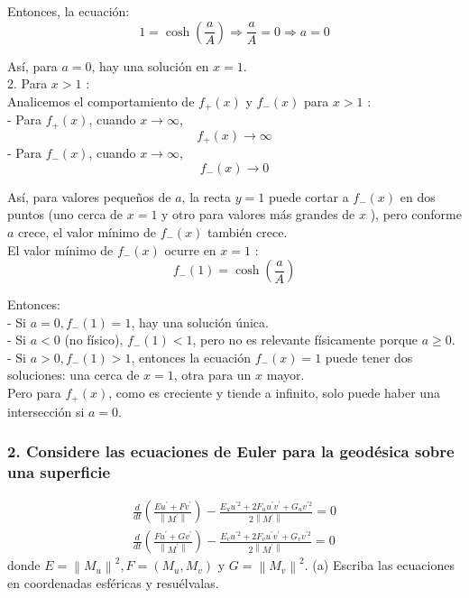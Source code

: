 \documentclass{article}
\theoremstyle{nonumberplain}
\begin{document}
Entonces, la ecuación:
\[
1=\cosh \left(\frac{a}{A}\right) \Longrightarrow \frac{a}{A}=0 \Longrightarrow a=0
\]

Así, para \( a=0 \), hay una solución en \( x=1 \).\\
2. Para \( x>1 \) :\\

Analicemos el comportamiento de \( f_{+}(x) \) y \( f_{-}(x) \) para \( x>1 \) :\\
- Para \( f_{+}(x) \), cuando \( x \rightarrow \infty \),
\[
f_{+}(x) \rightarrow \infty
\]
- Para \( f_{-}(x) \), cuando \( x \rightarrow \infty \),
\[
f_{-}(x) \rightarrow 0
\]

Así, para valores pequeños de \( a \), la recta \( y=1 \) puede cortar a \( f_{-}(x) \) en dos puntos (uno cerca de \( x=1 \) y otro para valores más grandes de \( x \) ), pero conforme \( a \) crece, el valor mínimo de \( f_{-}(x) \) también crece. \\

El valor mínimo de \( f_{-}(x) \) ocurre en \( x=1 \) :
\[
f_{-}(1)=\cosh \left(\frac{a}{A}\right)
\]

Entonces: \\
- Si \( a=0, f_{-}(1)=1 \), hay una solución única. \\
- Si \( a<0 \) (no físico), \( f_{-}(1)<1 \), pero no es relevante físicamente porque \( a \geq 0 \). \\
- Si \( a>0, f_{-}(1)>1 \), entonces la ecuación \( f_{-}(x)=1 \) puede tener dos soluciones: una cerca de \( x=1 \), otra para un \( x \) mayor. \\

Pero para \( f_{+}(x) \), como es creciente y tiende a infinito, solo puede haber una intersección si \( a=0 \).

\subsubsection*{2. Considere las ecuaciones de Euler para la geodésica sobre una superficie}
\[
\begin{array}{l}
\frac{d}{d t}\left(\frac{E u^{\prime}+F v^{\prime}}{\left\|M^{\prime}\right\|}\right)-\frac{E_{u} u^{\prime 2}+2 F_{u} u^{\prime} v^{\prime}+G_{u} v^{\prime 2}}{2\left\|M^{\prime}\right\|}=0 \\
\frac{d}{d t}\left(\frac{F u^{\prime}+G v^{\prime}}{\left\|M^{\prime}\right\|}\right)-\frac{E_{v} u^{\prime 2}+2 F_{v} u^{\prime} v^{\prime}+G_{v} v^{\prime 2}}{2\left\|M^{\prime}\right\|}=0
\end{array}
\]
donde \( E=\left\|M_{u}\right\|^{2}, F=\left(M_{u}, M_{v}\right) \) y \( G=\left\|M_{v}\right\|^{2} \).
(a) Escriba las ecuaciones en coordenadas esféricas y resuélvalas.
\end{document}
